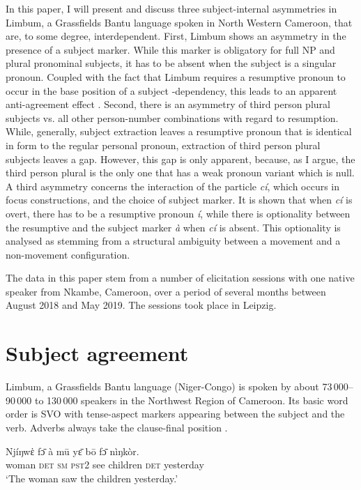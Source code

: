 \documentclass[output=paper]{langscibook}
\begin{document}
In this paper, I will present and discuss three subject-internal
asymmetries in Limbum, a Grassfields Bantu language spoken in North
Western Cameroon, that are, to some degree, interdependent. First,
Limbum shows an asymmetry in the presence of a subject marker. While
this marker is obligatory for full NP and plural pronominal subjects,
it has to be absent when the subject is a singular pronoun. Coupled
with the fact that Limbum requires a resumptive pronoun to occur in
the base position of a subject \Abar-dependency, this leads to an
apparent anti-agreement effect \citep[cf.][]{ouhalla93,baier18}.
Second, there is an asymmetry of third person plural subjects vs. all
other person-number combinations with regard to resumption. While,
generally, subject extraction leaves a resumptive pronoun that is
identical in form to the regular personal pronoun, extraction of third
person plural subjects leaves a gap. However, this gap is only
apparent, because, as I argue, the third person plural is the only one
that has a weak pronoun variant which is null. A third asymmetry concerns
the interaction of the particle \textit{cí}, which occurs in focus
constructions, and the choice of subject marker. It is shown that when
\textit{cí} is overt, there has to be a resumptive pronoun \textit{í},
while there is optionality between the resumptive and the subject marker \textit{à} when
\textit{cí} is absent. This optionality is analysed as stemming from
a structural ambiguity between a movement and a non-movement
configuration. 

The data in this paper stem from a number of elicitation sessions with one native speaker from Nkambe, Cameroon, over a period of several months between August 2018 and May 2019. The sessions took place in Leipzig.

\section{Subject agreement}\label{sec:johanneshein:subject-agreement}\largerpage

Limbum, a Grassfields Bantu language (Niger-Congo) is spoken by
about 73\,000--90\,000 \citep[][21]{fransen95} to 130\,000 speakers
\citep[according to a 2005 census,][]{ethnologue} in the Northwest
Region of Cameroon. Its basic word order is SVO with tense-aspect
markers appearing between the subject and the verb. Adverbs always
take the clause-final position .

\ea \label{ex:johanneshein:wordorder}
\gll Njíŋwὲ fɔ̄ à mū yɛ̄ bō fɔ̄ nìŋkòr.\\
woman \textsc{det} \textsc{sm} \textsc{pst2} see children \textsc{det} yesterday\\
\glt `The woman saw the children yesterday.'
\z
\end{document}
